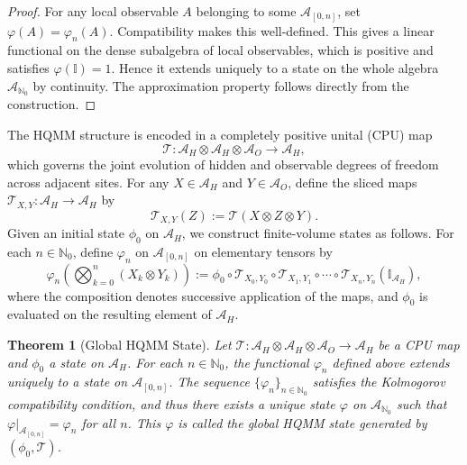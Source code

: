 \documentclass[12pt,a4paper]{article}
\newtheorem{theorem}{Theorem}[section]
\begin{document}
\begin{proof}
For any local observable $A$ belonging to some $\mathcal{A}_{[0,n]}$, set $\varphi(A) = \varphi_n(A)$. Compatibility makes this well-defined. This gives a linear functional on the dense subalgebra of local observables, which is positive and satisfies $\varphi(\mathbb{I}) = 1$. Hence it extends uniquely to a state on the whole algebra $\mathcal{A}_{\mathbb{N}_0}$ by continuity. The approximation property follows directly from the construction.
\end{proof}

The HQMM structure is encoded in a completely positive unital (CPU) map
\[
\mathcal{T}: \mathcal{A}_H \otimes \mathcal{A}_H \otimes \mathcal{A}_O \to \mathcal{A}_H,
\]
which governs the joint evolution of hidden and observable degrees of freedom across adjacent sites. For any $X \in \mathcal{A}_H$ and $Y \in \mathcal{A}_O$, define the sliced maps $\mathcal{T}_{X,Y}: \mathcal{A}_H \to \mathcal{A}_H$ by
\[
\mathcal{T}_{X,Y}(Z) := \mathcal{T}(X \otimes Z \otimes Y).
\]
Given an initial state $\phi_0$ on $\mathcal{A}_H$, we construct finite-volume states as follows. For each $n \in \mathbb{N}_0$, define $\varphi_n$ on $\mathcal{A}_{[0,n]}$ on elementary tensors by
\[
\varphi_n\!\left( \bigotimes_{k=0}^n (X_k \otimes Y_k) \right) := \phi_0 \circ \mathcal{T}_{X_0,Y_0} \circ \mathcal{T}_{X_1,Y_1} \circ \cdots \circ \mathcal{T}_{X_n,Y_n}(\mathbb{I}_{\mathcal{A}_H}),
\]
where the composition denotes successive application of the maps, and $\phi_0$ is evaluated on the resulting element of $\mathcal{A}_H$.

\begin{theorem}[Global HQMM State]
Let $\mathcal{T}: \mathcal{A}_H \otimes \mathcal{A}_H \otimes \mathcal{A}_O \to \mathcal{A}_H$ be a CPU map and $\phi_0$ a state on $\mathcal{A}_H$. For each $n \in \mathbb{N}_0$, the functional $\varphi_n$ defined above extends uniquely to a state on $\mathcal{A}_{[0,n]}$. The sequence $\{\varphi_n\}_{n \in \mathbb{N}_0}$ satisfies the Kolmogorov compatibility condition, and thus there exists a unique state $\varphi$ on $\mathcal{A}_{\mathbb{N}_0}$ such that $\varphi|_{\mathcal{A}_{[0,n]}} = \varphi_n$ for all $n$. This $\varphi$ is called the \textit{global HQMM state} generated by $(\phi_0, \mathcal{T})$.
\end{theorem}
\end{document}
